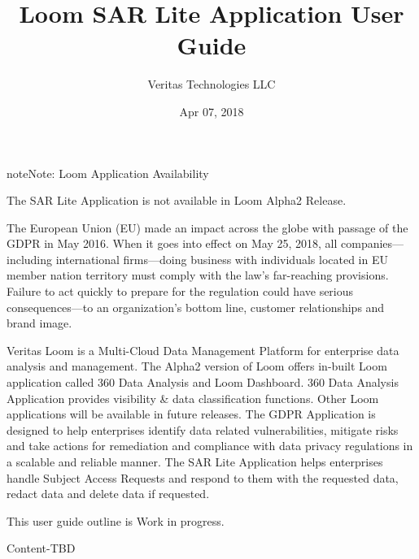 \documentclass[letterpaper,10pt,english]{sphinxmanual}
\title{Loom SAR Lite Application User Guide}
\date{Apr 07, 2018}
\author{Veritas Technologies LLC}
\begin{document}
\maketitle
\sphinxtableofcontents
{}\label{\detokenize{appug/sar_lite_app_ug::doc}}


\begin{sphinxadmonition}{note}{Note:}
Loom Application Availability

The SAR Lite Application is not available in Loom Alpha2 Release.
\end{sphinxadmonition}

The European Union (EU) made an impact across the globe with passage of the GDPR in May 2016. When it goes into effect on May 25, 2018, all companies—including international firms—doing business with individuals located in EU member nation territory must comply with the law’s far-reaching provisions. Failure to act quickly to prepare for the regulation could have serious consequences—to an organization’s bottom line, customer relationships and brand image.

Veritas Loom is a Multi-Cloud Data Management Platform for enterprise data analysis and management. The Alpha2 version of Loom offers in-built Loom application called 360 Data Analysis and Loom Dashboard.  360 Data Analysis Application provides visibility \& data classification functions. Other Loom applications will be available in future releases.  The GDPR Application is designed to help enterprises identify data related vulnerabilities, mitigate risks and take actions for remediation and compliance with data privacy regulations in a scalable and reliable manner. The SAR Lite Application helps enterprises handle Subject Access Requests and respond to them with the requested data, redact data and delete data if requested.

This user guide outline is Work in progress.

Content-TBD



\renewcommand{\indexname}{Index}
\printindex
\end{document}

